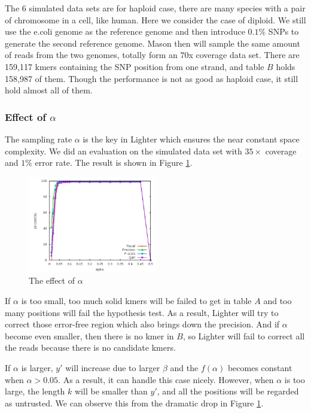 \documentclass[10pt]{article}
\begin{document}
The 6 simulated data sets are for haploid case, there are many species with a pair of chromosome in a cell, like human. Here we consider the case of diploid. We still use the e.coli genome as the reference genome and then introduce $0.1\%$ SNPs to generate the second reference genome. Mason then will sample the same amount of reads from the two genomes, totally form an $70$x coverage data set. There are 159,117 kmers containing the SNP position from one strand, and table $B$ holds 158,987 of them. Though the performance is not as good as haploid case, it still hold almost all of them. 

\subsubsection*{Effect of $\alpha$}
The sampling rate $\alpha$ is the key in Lighter which ensures the near constant space complexity. We did an evaluation on the simulated data set with $35\times$ coverage and $1\%$ error rate. The result is shown in Figure \ref{fig:alpha}.

\begin{figure}[h!]
\begin{center}
\includegraphics[width=0.5\textwidth]{alpha.jpg}
\caption{The effect of $\alpha$\label{fig:alpha}}
\end{center}
\end{figure}

If $\alpha$ is too small, too much solid kmers will be failed to get in table $A$ and too many positions will fail the hypothesis test. As a result, Lighter will try to correct those error-free region which also brings down the precision. And if $\alpha$ become even smaller, then there is no kmer in $B$, so Lighter will fail to correct all the reads because there is no candidate kmers. 

If $\alpha$ is larger, $y'$ will increase due to larger $\beta$ and the $f(\alpha)$ becomes constant when $\alpha>0.05$. As a result, it can handle this case nicely. However, when $\alpha$ is too large, the \kmer length $k$ will be smaller than $y'$, and all the positions will be regarded as untrusted. We can observe this from the dramatic drop in Figure \ref{fig:alpha}.
\end{document}
